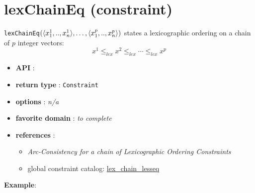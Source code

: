 \label{lexchaineq}
\hypertarget{lexchaineq}{}

\section{lexChainEq (constraint)}\label{lexchaineq:lexchaineqconstraint}\hypertarget{lexchaineq:lexchaineqconstraint}{}
\begin{notedef}
  \texttt{lexChainEq}$(\langle x^1_1,..,x^1_n\rangle,\ldots,\langle x^p_1,..,x^p_n\rangle)$ states a lexicographic ordering on a chain of $p$ integer vectors:
$$x^1 \le_{lex} x^2 \le_{lex}\cdots\le_{lex} x^p$$
\end{notedef}

\begin{itemize}
	\item \textbf{API} : 
	\item \textbf{return type} : \texttt{Constraint}
	\item \textbf{options} : \emph{n/a}
	\item \textbf{favorite domain} : \emph{to complete}
	\item \textbf{references} :
      \begin{itemize}
      \item \cite{BeldiceanuSICS02} \emph{Arc-Consistency for a chain of Lexicographic Ordering Constraints} 
      \item global constraint catalog: \href{http://www.emn.fr/x-info/sdemasse/gccat/Clex_chain_lesseq.html}{lex\_chain\_lesseq}
      \end{itemize}
\end{itemize}

\textbf{Example}:

